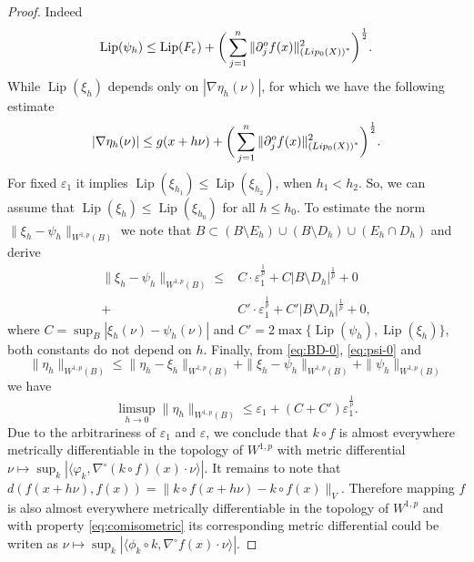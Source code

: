 \documentclass[10pt,a4paper]{amsart}
\begin{document}
\begin{proof}
Indeed
\[
\operatorname{Lip}(\psi_h) \leq \operatorname{Lip}(F_\varepsilon) + \bigg(\sum_{j=1}^n \|\partial^o_jf(x) \|^2_{\left(\textnormal{Lip}_{0}(X)\right)^*} \bigg)^{\frac{1}{2}}.
\]
While $\operatorname{Lip}(\xi_h)$ depends only on $|\nabla \eta_h (\nu)|$, for which we have the following estimate
\[
|\nabla \eta_h(\nu)| \leq g(x + h\nu) + \bigg(\sum_{j=1}^n \|\partial^o_jf(x) \|^2_{\left(\textnormal{Lip}_{0}(X)\right)^*} \bigg)^{\frac{1}{2}}.
\]
For fixed $\varepsilon_1$ it implies $\operatorname{Lip}(\xi_{h_1}) \leq \operatorname{Lip}(\xi_{h_2})$, when $h_1<h_2$.
So, we can assume that $\operatorname{Lip}(\xi_h) \leq \operatorname{Lip}(\xi_{h_0})$ for all $h\leq h_0$.
To estimate the norm $\|\xi_h - \psi_h \|_{W^{1,p}(B)}$ we note that $B\subset (B\setminus E_h)\cup (B\setminus D_h)\cup (E_h\cap D_h)$
and derive
\begin{align*}
\|\xi_h - \psi_h \|_{W^{1,p}(B)} \leq &C\cdot\varepsilon_1^{\frac{1}{p}} + C|B\setminus D_h|^{\frac{1}{p}} + 0\\
+ &C'\cdot\varepsilon_1^{\frac{1}{p}} + C'|B\setminus D_h|^{\frac{1}{p}} + 0,
\end{align*}
where $C = \sup_{B}|\xi_h(\nu) - \psi_h(\nu)| $ and $C' = 2\max\{\operatorname{Lip}(\psi_h), \operatorname{Lip}(\xi_h) \}$,
both constants do not depend on $h$.
Finally, from \eqref{eq:BD-0}, \eqref{eq:psi-0} and 
\[
\|\eta_h \|_{W^{1,p}(B)} \leq \|\eta_h -\xi_h \|_{W^{1,p}(B)} + \|\xi_h - \psi_h \|_{W^{1,p}(B)} + \|\psi_h \|_{W^{1,p}(B)}
\]
we have
\[
\limsup_{h\to 0 } \|\eta_h \|_{W^{1,p}(B)} \leq \varepsilon_1 + (C+ C')\varepsilon_1^{\frac{1}{p}}.
\]
Due to the arbitrariness of $\varepsilon_1$ and $\varepsilon$, we conclude that $k\circ f$ is almost everywhere metrically differentiable in the topology of $W^{1,p}$
with metric differential $\nu\mapsto \sup_k|  \langle \varphi_k, \nabla^{\circ} (k\circ f)(x)\cdot\nu \rangle|$.
It remains to note that $d(f(x+h\nu), f(x)) = \|k\circ f(x+h\nu) - k\circ f(x)\|_V$. Therefore mapping $f$ is also almost everywhere metrically differentiable in the topology of $W^{1,p}$
and with property \eqref{eq:comisometric} its corresponding metric differential could be writen as 
$\nu\mapsto \sup_k|  \langle \phi_k\circ k, \nabla^{\circ} f(x)\cdot\nu \rangle|$.
\end{proof}
\end{document}
